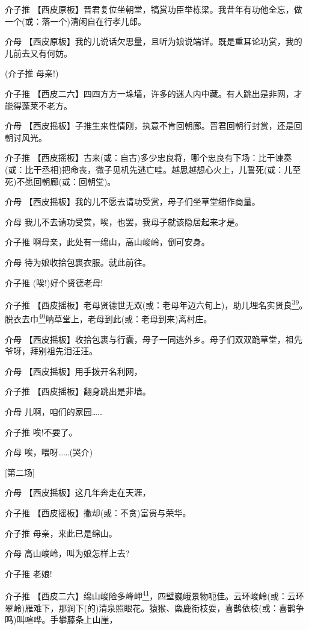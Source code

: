 介子推
【西皮原板】晋君复位坐朝堂，犒赏功臣举栋梁。我昔年有功他全忘，做一个(或：落一个)清闲自在行孝儿郎。

介母
【西皮原板】我的儿说话欠思量，且听为娘说端详。既是重耳论功赏，我的儿前去又有何妨。

(介子推 母亲!)

介子推
【西皮二六】四四方方一垛墙，许多的迷人内中藏。有人跳出是非网，才能得蓬莱不老方。

介母
【西皮摇板】子推生来性情刚，执意不肯回朝廊。晋君回朝行封赏，还是回朝讨风光。

介子推
【西皮摇板】古来(或：自古)多少忠良将，哪个忠良有下场：比干谏奏(或：比干丞相)把命丧，微子见机先逃亡哇。越思越想心火上，儿誓死(或：儿至死)不愿回朝廊(或：回朝堂)。

介母 【西皮摇板】我的儿不愿去请功受赏，母子们坐草堂细作商量。

介母 我儿不去请功受赏，唉，也罢，我母子就该隐居起来才是。

介子推 啊母亲，此处有一绵山，高山峻岭，倒可安身。

介母 待为娘收拾包裹衣服。就此前往。

介子推 (唉!)好个贤德老母!

介子推
【西皮摇板】老母贤德世无双(或：老母年迈六旬上)，助儿埋名实贤良\protect\hyperlink{fn39}{\textsuperscript{39}}。脱衣去巾\protect\hyperlink{fn40}{\textsuperscript{40}}呐草堂上，老母到此(或：老母到来)离村庄。

介母
【西皮摇板】收拾包裹与行囊，母子一同逃外乡。母子们双双跪草堂，祖先爷呀，拜别祖先泪汪汪。

介母 【西皮摇板】用手拨开名利网，

介子推 【西皮摇板】翻身跳出是非墙。

介母 儿啊，咱们的家园\ldots{}\ldots{}

介子推 唉!不要了。

介母 唉，喂呀\ldots{}\ldots{}(哭介)

{[}第二场{]}

介母 【西皮摇板】这几年奔走在天涯，

介子推 【西皮摇板】撇却(或：不贪)富贵与荣华。

介子推 母亲，来此已是绵山。

介母 高山峻岭，叫为娘怎样上去?

介子推 老娘!

介子推
【西皮二六】绵山峻险多峰岬\protect\hyperlink{fn41}{\textsuperscript{41}}，四壁巍峨景物呃佳。云环峻岭(或：云环翠岭)雁难下，那涧下(的)清泉照眼花。猿猴、麋鹿衔枝耍，喜鹊依枝(或：喜鹊争鸣)叫喧哗。手攀藤条上山崖，


